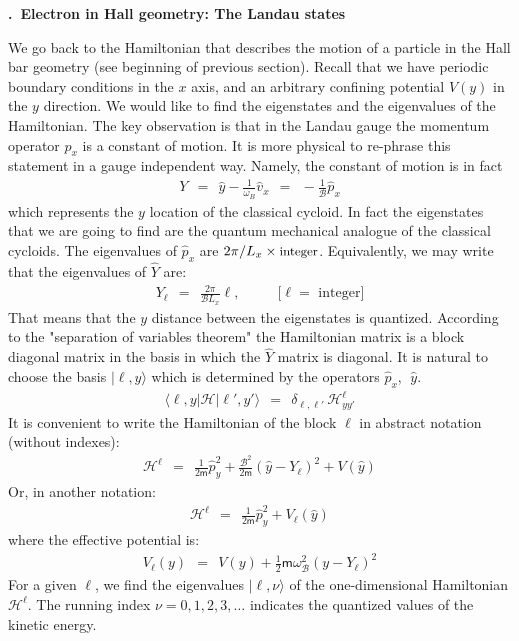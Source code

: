 \documentclass[onecolumn,fleqn, 11pt]{revtex4}
\newcommand{\mass}{\mathsf{m}}
\newcommand{\beq}{\begin{eqnarray}}
\newcommand{\eeq}{\end{eqnarray}}
\renewcommand{\thesubsection}{\arabic{subsection}}
\renewcommand{\thesubsubsection}{\arabic{subsubsection}}
\newcommand{\sheadC}[1]
{
\addtocounter{subsubsection}{1}
\vspace{5mm}
{\bf \thesubsection.\thesubsubsection \ #1}  
\nopagebreak
\phantomsection
}
\begin{document}
\sheadC{Electron in Hall geometry: The Landau states} 

We go back to the Hamiltonian that describes the motion of a particle 
in the Hall bar geometry (see beginning of previous section).  
Recall that we have periodic boundary conditions 
in the $x$ axis, and an arbitrary confining potential $V(y)$ 
in the $y$ direction. We would like to find the eigenstates and 
the eigenvalues of the Hamiltonian. 
The key observation is that in the Landau gauge the 
momentum operator $p_x$ is a constant of motion.
It is more physical to re-phrase this statement 
in a gauge independent way. Namely, the constant 
of motion is in fact   
\beq
Y \ \ = \ \ \hat{y}-\frac{1}{\omega_B}\hat{v}_x
\ \ = \ \ -\frac{1}{\mathcal{B}}\hat{p}_x 
\eeq
which represents the $y$ location of the classical cycloid. 
In fact the eigenstates that we are going to find 
are the quantum mechanical analogue of the classical cycloids. 
The eigenvalues of ${\hat{p}_x }$ 
are ${ {2 \pi}/{L_x} \times \mbox{\small integer} }$. 
Equivalently, we may write that the eigenvalues 
of ${\hat{Y} }$ are:
\beq
Y_{\ell} \ \ = \ \ \frac{2 \pi}{\mathcal{B}L_x}\ell,  
\ \ \ \ \ \ \ \ \ \ \ \ 
\mbox{[$\ell =$ integer]} 
\eeq
That means that the $y$ distance between the eigenstates  
is quantized. According to the "separation of variables theorem"  
the Hamiltonian matrix is a block diagonal matrix 
in the basis in which the ${\hat{Y}}$ matrix is diagonal. 
It is natural to choose the basis ${|\ell, y \rangle}$ 
which is determined by the operators ${\hat{p}_x, \ \ \hat{y}}$.
\beq
\langle \ell, y | \mathcal{H} | \ell', y' \rangle \ \ 
= \ \ \delta_{\ell,\ell'} \, \mathcal{H}^{\ell}_{yy'} 
\eeq
It is convenient to write the Hamiltonian 
of the block ${\ell}$ in abstract notation (without indexes):
\beq
\mathcal{H}^{\ell} 
\ \ = \ \ \frac{1}{2\mass}\hat{p}^2_y 
+ \frac{\mathcal{B}^2}{2\mass} ( \hat{y}-Y_{\ell} )^2 + V( \hat{y} ) 
\eeq
Or, in another notation:
\beq
\mathcal{H}^{\ell} 
\ \ = \ \ \frac{1}{2\mass}\hat{p}^2_y + V_{\ell} ( \hat{y} ) 
\eeq
where the effective potential is:
\beq
V_{\ell} (y) 
\ \ = \ \ V(y) + \frac{1}{2}\mass \omega_\mathcal{B}^2 ( y - Y_{\ell} )^2 
\eeq
For a given ${\ell}$, we find the 
eigenvalues ${| \ell, \nu \rangle}$ of 
the one-dimensional Hamiltonian ${\mathcal{H}^{\ell}}$. 
The running index ${\nu=0,1,2,3, \dots }$ 
indicates the quantized values of the kinetic energy.
\end{document}
